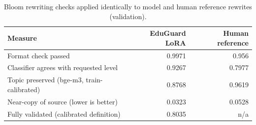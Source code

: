 \begin{table}[t]
\centering
\caption{Bloom rewriting checks applied identically to model and human reference rewrites (validation).}
\label{tab:t7_bloom_model_vs_reference}
\begin{tabular}{lrr}
\toprule
Measure & EduGuard LoRA & Human reference \\
\midrule
Format check passed & 0.9971 & 0.956 \\
Classifier agrees with requested level & 0.9267 & 0.7977 \\
Topic preserved (bge-m3, train-calibrated) & 0.8768 & 0.9619 \\
Near-copy of source (lower is better) & 0.0323 & 0.0528 \\
Fully validated (calibrated definition) & 0.8035 & n/a \\
\bottomrule
\end{tabular}
\end{table}
